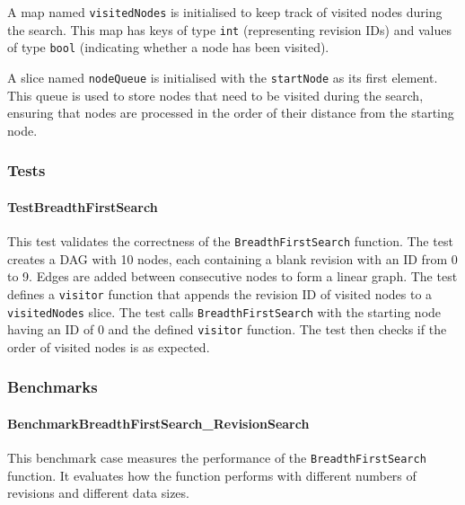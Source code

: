 A map named \lstinline{visitedNodes} is initialised to keep track of visited nodes during the search. This map has keys of type \lstinline{int} (representing revision IDs) and values of type \lstinline{bool} (indicating whether a node has been visited).
\smallskip

A slice named \lstinline{nodeQueue} is initialised with the \lstinline{startNode} as its first element. This queue is used to store nodes that need to be visited during the search, ensuring that nodes are processed in the order of their distance from the starting node.

\subsubsection{Tests}

\paragraph{TestBreadthFirstSearch}
This test validates the correctness of the \lstinline{BreadthFirstSearch} function. The test creates a DAG with 10 nodes, each containing a blank revision with an ID from 0 to 9. Edges are added between consecutive nodes to form a linear graph. The test defines a \lstinline{visitor} function that appends the revision ID of visited nodes to a \lstinline{visitedNodes} slice. The test calls \lstinline{BreadthFirstSearch} with the starting node having an ID of 0 and the defined \lstinline{visitor} function. The test then checks if the order of visited nodes is as expected.

\subsubsection{Benchmarks}

\paragraph{BenchmarkBreadthFirstSearch\_RevisionSearch}
This benchmark case measures the performance of the \lstinline{BreadthFirstSearch} function. It evaluates how the function performs with different numbers of revisions and different data sizes.

